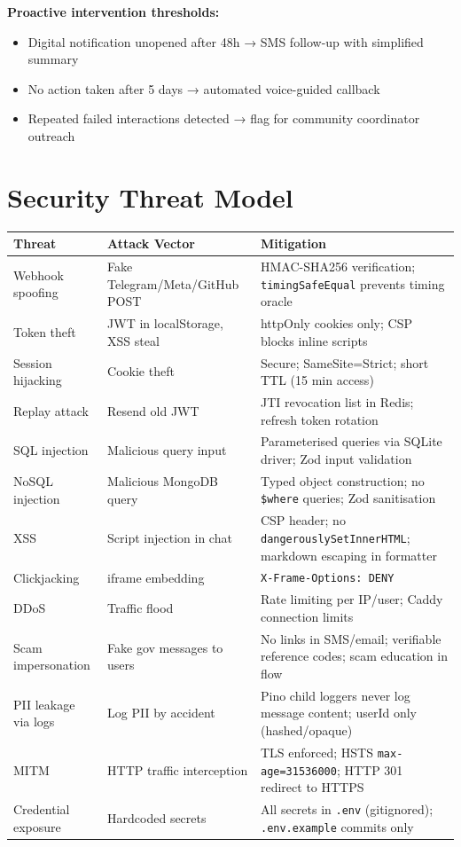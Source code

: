 \documentclass[12pt,a4paper]{article}
\begin{document}
\textbf{Proactive intervention thresholds:}
\begin{itemize}[noitemsep]
  \item Digital notification unopened after 48h → SMS follow-up with simplified summary
  \item No action taken after 5 days → automated voice-guided callback
  \item Repeated failed interactions detected → flag for community coordinator outreach
\end{itemize}

\section{Security Threat Model}
\label{sec:threats}

\begin{longtable}{@{}lp{4cm}p{7cm}@{}}
\toprule
\textbf{Threat} & \textbf{Attack Vector} & \textbf{Mitigation} \\
\midrule
\endhead
Webhook spoofing     & Fake Telegram/Meta/GitHub POST & HMAC-SHA256 verification; \texttt{timingSafeEqual} prevents timing oracle \\
Token theft          & JWT in localStorage, XSS steal & httpOnly cookies only; CSP blocks inline scripts \\
Session hijacking    & Cookie theft & Secure; SameSite=Strict; short TTL (15 min access) \\
Replay attack        & Resend old JWT & JTI revocation list in Redis; refresh token rotation \\
SQL injection        & Malicious query input & Parameterised queries via SQLite driver; Zod input validation \\
NoSQL injection      & Malicious MongoDB query & Typed object construction; no \texttt{\$where} queries; Zod sanitisation \\
XSS                  & Script injection in chat & CSP header; no \texttt{dangerouslySetInnerHTML}; markdown escaping in formatter \\
Clickjacking         & iframe embedding & \texttt{X-Frame-Options: DENY} \\
DDoS                 & Traffic flood & Rate limiting per IP/user; Caddy connection limits \\
Scam impersonation   & Fake gov messages to users & No links in SMS/email; verifiable reference codes; scam education in flow \\
PII leakage via logs & Log PII by accident & Pino child loggers never log message content; userId only (hashed/opaque) \\
MITM                 & HTTP traffic interception & TLS enforced; HSTS \texttt{max-age=31536000}; HTTP 301 redirect to HTTPS \\
Credential exposure  & Hardcoded secrets & All secrets in \texttt{.env} (gitignored); \texttt{.env.example} commits only \\
\bottomrule
\end{longtable}
\end{document}
